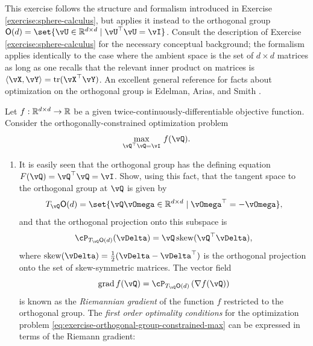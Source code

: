 \documentclass[../../book-main.tex]{subfiles}
\begin{document}
\begin{exercise}\label{exercise:orthogonal-group-calculus}
    This exercise follows the structure and formalism introduced in Exercise \ref{exercise:sphere-calculus}, but applies it instead to the orthogonal group $\O(d) = \set{\vU \in \R^{d \times d} \given \vU^\top \vU = \vI}$. 
    Consult the description of Exercise \ref{exercise:sphere-calculus} for the necessary conceptual background; the formalism applies identically to the case where the ambient space is the set of $d \times d$ matrices as long as one recalls that the relevant inner product on matrices is $\ip{\vX}{\vY} = \tr(\vX^\top \vY)$.
    An excellent general reference for facts about optimization on the orthogonal group is Edelman, Arias, and Smith \cite{Edelman1998-lg}.
    
    Let $f : \mathbb{R}^{d\times d} \to \mathbb{R}$ be a given twice-continuously-differentiable objective function. Consider the orthogonally-constrained optimization problem
    \begin{equation}\label{eq:exercise-orthogonal-group-constrained-max}
        \max_{\vQ^\top \vQ = \vI}\, f(\vQ). 
    \end{equation}
    \begin{enumerate}
        \item  It is easily seen that the orthogonal group has the defining equation $F(\vQ) = \vQ^\top \vQ = \vI$.
        Show, using this fact, that the tangent space to the orthogonal group at $\vQ$ is given by
        \begin{equation*}
            T_{\vQ} \O(d) = \set{\vQ \vOmega \in \R^{d\times d} \given \vOmega^\top = - \vOmega},
        \end{equation*}
        and that the orthogonal projection onto this subspace is 
        \begin{equation*}
        \cP_{T_{\vQ}\O(d)}(\vDelta) =  \vQ \Skew(\vQ^\top \vDelta),
        \end{equation*}
        where $\Skew(\vDelta) = \tfrac{1}{2} ( \vDelta - \vDelta^\top)$ is the orthogonal projection onto the set of skew-symmetric matrices.
        The vector field 
        \begin{equation}\label{eq:exercise-riemann-grad-orthogonal-group}
        \mathrm{grad}\, f(\vQ) = \cP_{T_{\vQ} \O(d)} \left( \nabla f(\vQ) \right)
        \end{equation}
        is known as the \textit{Riemannian gradient} of the function $f$ restricted to the orthogonal group.
        The \textit{first order optimality conditions} for the optimization problem \eqref{eq:exercise-orthogonal-group-constrained-max} can be expressed in terms of the Riemann gradient:

\end{enumerate}
\end{exercise}
\end{document}
